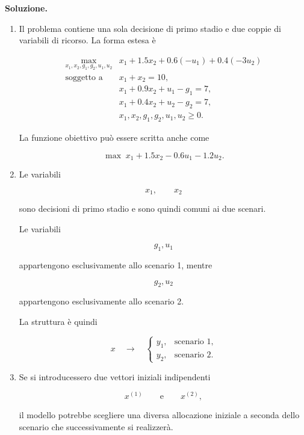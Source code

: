 \noindent
\textbf{Soluzione.}

\begin{enumerate}

\item Il problema contiene una sola decisione di primo stadio e due coppie
di variabili di ricorso. La forma estesa \`e

\[
\begin{array}{ll}
\max\limits_{x_1,x_2,g_1,g_2,u_1,u_2}
&
\displaystyle
x_1+1.5x_2
+
0.6(-u_1)
+
0.4(-3u_2)
\\[8pt]

\mbox{soggetto a}
&
x_1+x_2=10,
\\[6pt]

&
x_1+0.9x_2+u_1-g_1=7,
\\[6pt]

&
x_1+0.4x_2+u_2-g_2=7,
\\[6pt]

&
x_1,x_2,g_1,g_2,u_1,u_2\geq0.
\end{array}
\]

La funzione obiettivo pu\`o essere scritta anche come

\[
\max\;
x_1+1.5x_2
-
0.6u_1
-
1.2u_2.
\]

\item Le variabili

\[
x_1,\qquad x_2
\]

sono decisioni di primo stadio e sono quindi comuni ai due scenari.

Le variabili

\[
g_1,u_1
\]

appartengono esclusivamente allo scenario 1, mentre

\[
g_2,u_2
\]

appartengono esclusivamente allo scenario 2.

La struttura \`e quindi

\[
x
\quad\longrightarrow\quad
\begin{cases}
y_1, & \text{scenario 1},\\
y_2, & \text{scenario 2}.
\end{cases}
\]

\item Se si introducessero due vettori iniziali indipendenti

\[
x^{(1)}
\qquad\text{e}\qquad
x^{(2)},
\]

il modello potrebbe scegliere una diversa allocazione iniziale a seconda dello
scenario che successivamente si realizzer\`a.


\end{enumerate}
